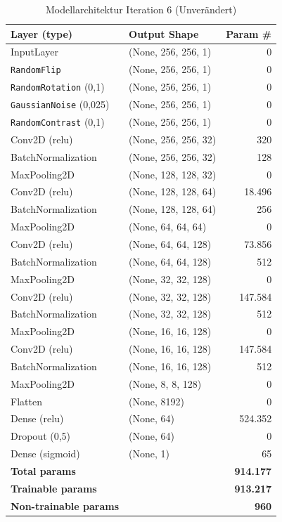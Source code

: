 \documentclass[
    a4paper,        %
    11pt,           %
    ngerman,        %
    parskip=half,   %
    listof=totoc,   %
    bibliography=totoc %
]{scrartcl}
\begin{document}
\begin{table}[H]
    \centering
    \caption{Modellarchitektur Iteration 6 (Unverändert)}
    \label{tab:model_summary_iter6}
    \begin{tabular}{llr}
        \toprule
        \textbf{Layer (type)} & \textbf{Output Shape} & \textbf{Param \#} \\
        \midrule
        InputLayer & (None, 256, 256, 1) & 0 \\
        \texttt{RandomFlip} & (None, 256, 256, 1) & 0 \\
        \texttt{RandomRotation} (0,1) & (None, 256, 256, 1) & 0 \\
        \texttt{GaussianNoise} (0,025) & (None, 256, 256, 1) & 0 \\
        \texttt{RandomContrast} (0,1) & (None, 256, 256, 1) & 0 \\
        Conv2D (relu) & (None, 256, 256, 32) & 320 \\
        BatchNormalization & (None, 256, 256, 32) & 128 \\
        MaxPooling2D & (None, 128, 128, 32) & 0 \\
        Conv2D (relu) & (None, 128, 128, 64) & 18.496 \\
        BatchNormalization & (None, 128, 128, 64) & 256 \\
        MaxPooling2D & (None, 64, 64, 64) & 0 \\
        Conv2D (relu) & (None, 64, 64, 128) & 73.856 \\
        BatchNormalization & (None, 64, 64, 128) & 512 \\
        MaxPooling2D & (None, 32, 32, 128) & 0 \\
        Conv2D (relu) & (None, 32, 32, 128) & 147.584 \\
        BatchNormalization & (None, 32, 32, 128) & 512 \\
        MaxPooling2D & (None, 16, 16, 128) & 0 \\
        Conv2D (relu) & (None, 16, 16, 128) & 147.584 \\
        BatchNormalization & (None, 16, 16, 128) & 512 \\
        MaxPooling2D & (None, 8, 8, 128) & 0 \\
        Flatten & (None, 8192) & 0 \\
        Dense (relu) & (None, 64) & 524.352 \\
        Dropout (0,5) & (None, 64) & 0 \\
        Dense (sigmoid) & (None, 1) & 65 \\
        \midrule
        \textbf{Total params} & & \textbf{914.177} \\
        \textbf{Trainable params} & & \textbf{913.217} \\
        \textbf{Non-trainable params} & & \textbf{960} \\
        \bottomrule
    \end{tabular}
\end{table}
\end{document}
